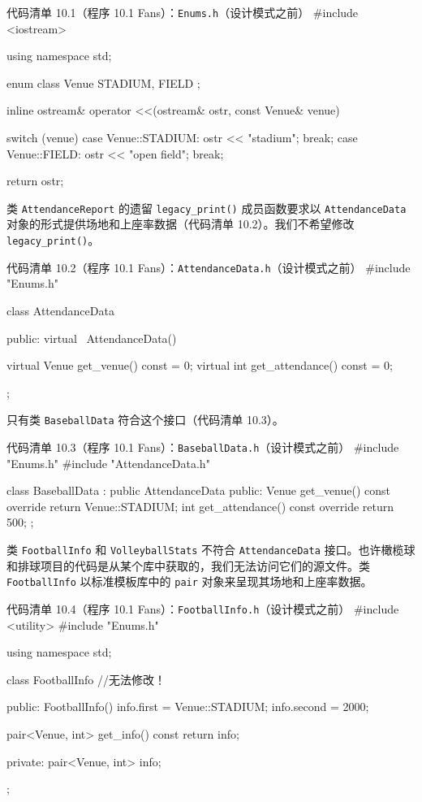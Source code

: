 \begin{codeboxt}{代码清单 10.1（程序 10.1 Fans）：\texttt{Enums.h}（设计模式之前）}
#include <iostream>

using namespace std;

enum class Venue { STADIUM, FIELD };

inline ostream& operator <<(ostream& ostr, const Venue& venue)
{
    switch (venue)
    {
        case Venue::STADIUM: ostr << "stadium";    break;
        case Venue::FIELD:   ostr << "open field"; break;
    }

    return ostr;
}
\end{codeboxt}

类 \texttt{Attendance\allowbreak{}Report} 的遗留 \texttt{legacy\_\allowbreak{}print(\allowbreak{})\allowbreak{}} 成员函数要求以 \texttt{Attendance\allowbreak{}Data} 对象的形式提供场地和上座率数据（代码清单 10.2）。我们不希望修改 \texttt{legacy\_\allowbreak{}print(\allowbreak{})\allowbreak{}}。

\begin{codeboxt}{代码清单 10.2（程序 10.1 Fans）：\texttt{Attendance\allowbreak{}Data.\allowbreak{}h}（设计模式之前）}
#include "Enums.h"

class AttendanceData
{
public:
    virtual ~AttendanceData() {}

    virtual Venue get_venue()      const = 0;
    virtual int   get_attendance() const = 0;
};
\end{codeboxt}

只有类 \texttt{Baseball\allowbreak{}Data} 符合这个接口（代码清单 10.3）。

\begin{codeboxt}{代码清单 10.3（程序 10.1 Fans）：\texttt{Baseball\allowbreak{}Data.\allowbreak{}h}（设计模式之前）}
#include "Enums.h"
#include "AttendanceData.h"

class BaseballData : public AttendanceData
{
public:
    Venue get_venue()      const override { return Venue::STADIUM; }
    int   get_attendance() const override { return 500; }
};
\end{codeboxt}

类 \texttt{Football\allowbreak{}Info} 和 \texttt{Volleyball\allowbreak{}Stats} 不符合 \texttt{Attendance\allowbreak{}Data} 接口。也许橄榄球和排球项目的代码是从某个库中获取的，我们无法访问它们的源文件。类 \texttt{Football\allowbreak{}Info} 以标准模板库中的 \texttt{pair} 对象来呈现其场地和上座率数据。

\begin{codeboxt}{代码清单 10.4（程序 10.1 Fans）：\texttt{Football\allowbreak{}Info.\allowbreak{}h}（设计模式之前）}
#include <utility>
#include "Enums.h"

using namespace std;

class FootballInfo  //无法修改！
{
public:
    FootballInfo()
    {
        info.first  = Venue::STADIUM;
        info.second = 2000;
    }

    pair<Venue, int> get_info() const { return info; }

private:
    pair<Venue, int> info;
};
\end{codeboxt}

